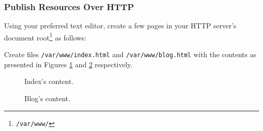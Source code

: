 \documentclass[pdftex,12pt,a4paper]{article}
\begin{document}
            \subsubsection{Publish Resources Over HTTP}
                Using your preferred text editor, create a few pages in your
                HTTP server's document root\footnote{\texttt{/var/www/}} as
                follows:

                Create files \texttt{/var/www/index.html} and 
                \texttt{/var/www/blog.html} with the contents as presented in
                Figures \ref{fig:index.html} and \ref{fig:blog.html}
                respectively.
                \begin{figure}[tbh]
                    \centering
                    
                    \caption{Index's content.}
                    \label{fig:index.html}
                \end{figure}

                \begin{figure}[tbh]
                    \centering
                    
                    \caption{Blog's content.}
                    \label{fig:blog.html}
                \end{figure}
\end{document}
